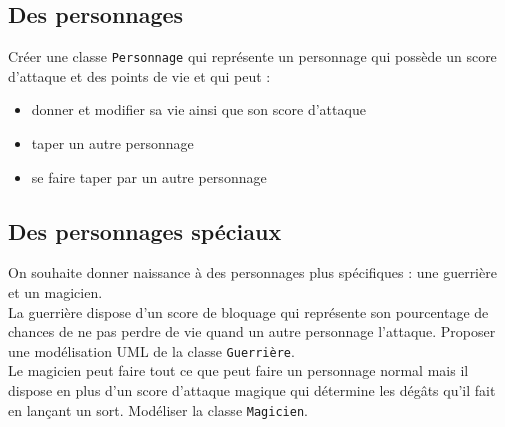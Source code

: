 \documentclass[12pt]{article}
\begin{document}
\subsection{Des personnages}
Créer une classe \texttt{Personnage} qui représente un personnage qui possède un score d'attaque et des points de vie et qui peut :
\begin{itemize}
	\item donner et modifier sa vie ainsi que son score d'attaque
	\item taper un autre personnage
	\item se faire taper par un autre personnage
\end{itemize}

\subsection{Des personnages spéciaux}
On souhaite donner naissance à des personnages plus spécifiques : une guerrière et un magicien.\\
La guerrière dispose d'un score de bloquage qui représente son pourcentage de chances de ne pas perdre de vie quand un autre personnage l'attaque. Proposer une modélisation UML de la classe \texttt{Guerrière}. \\
Le magicien peut faire tout ce que peut faire un personnage normal mais il dispose en plus d'un score d'attaque magique qui détermine les dégâts qu'il fait en lançant un sort. Modéliser la classe \texttt{Magicien}.
\end{document}
